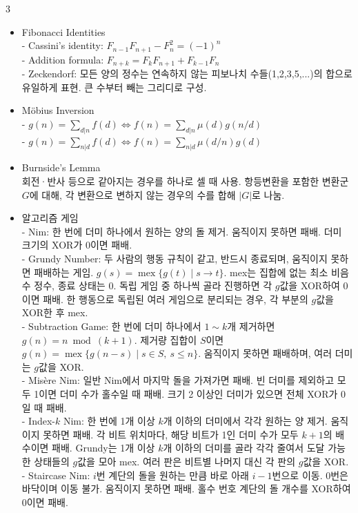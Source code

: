 \documentclass[landscape, 8pt, a4paper, oneside]{extarticle}
\begin{document}
\begin{multicols*}{3}
\begin{itemize}
    - 제곱의 합: $\sum_{i=0}^N \binom{N}{i}^2 = \binom{2N}{N}$
    \item Fibonacci Identities\\
    - Cassini's identity: $F_{n-1}F_{n+1} - F_n^2 = (-1)^n$\\
    - Addition formula: $F_{n+k} = F_k F_{n+1} + F_{k-1} F_n$\\
    - Zeckendorf: 모든 양의 정수는 연속하지 않는 피보나치 수들(1,2,3,5,...)의 합으로 유일하게 표현. 큰 수부터 빼는 그리디로 구성.
    \item Möbius Inversion\\
    - $g(n) = \sum_{d|n} f(d) \iff f(n) = \sum_{d|n} \mu(d)g(n/d)$\\
    - $g(n) = \sum_{n|d} f(d) \iff f(n) = \sum_{n|d} \mu(d/n)g(d)$
    \item Burnside’s Lemma\\
    회전·반사 등으로 같아지는 경우를 하나로 셀 때 사용. 항등변환을 포함한 변환군 $G$에 대해, 각 변환으로 변하지 않는 경우의 수를 합해 $|G|$로 나눔.
    \item 알고리즘 게임\\
    - Nim: 한 번에 더미 하나에서 원하는 양의 돌 제거. 움직이지 못하면 패배. 더미 크기의 XOR가 0이면 패배.\\
    - Grundy Number: 두 사람의 행동 규칙이 같고, 반드시 종료되며, 움직이지 못하면 패배하는 게임. $g(s)=\operatorname{mex}\{g(t)\mid s\to t\}$. mex는 집합에 없는 최소 비음수 정수, 종료 상태는 0. 독립 게임 중 하나씩 골라 진행하면 각 $g$값을 XOR하여 0이면 패배. 한 행동으로 독립된 여러 게임으로 분리되는 경우, 각 부분의 $g$값을 XOR한 후 mex.\\
    - Subtraction Game: 한 번에 더미 하나에서 $1\sim k$개 제거하면 $g(n)=n\bmod(k+1)$. 제거량 집합이 $S$이면 $g(n)=\operatorname{mex}\{g(n-s)\mid s\in S,\ s\le n\}$. 움직이지 못하면 패배하며, 여러 더미는 $g$값을 XOR.\\
    - Misère Nim: 일반 Nim에서 마지막 돌을 가져가면 패배. 빈 더미를 제외하고 모두 1이면 더미 수가 홀수일 때 패배. 크기 2 이상인 더미가 있으면 전체 XOR가 0일 때 패배.\\
    - Index-$k$ Nim: 한 번에 1개 이상 $k$개 이하의 더미에서 각각 원하는 양 제거. 움직이지 못하면 패배. 각 비트 위치마다, 해당 비트가 1인 더미 수가 모두 $k+1$의 배수이면 패배. Grundy는 1개 이상 $k$개 이하의 더미를 골라 각각 줄여서 도달 가능한 상태들의 $g$값을 모아 mex. 여러 판은 비트별 나머지 대신 각 판의 $g$값을 XOR.\\
    - Staircase Nim: $i$번 계단의 돌을 원하는 만큼 바로 아래 $i-1$번으로 이동. 0번은 바닥이며 이동 불가. 움직이지 못하면 패배. 홀수 번호 계단의 돌 개수를 XOR하여 0이면 패배.\\

\end{itemize}
\end{multicols*}
\end{document}
